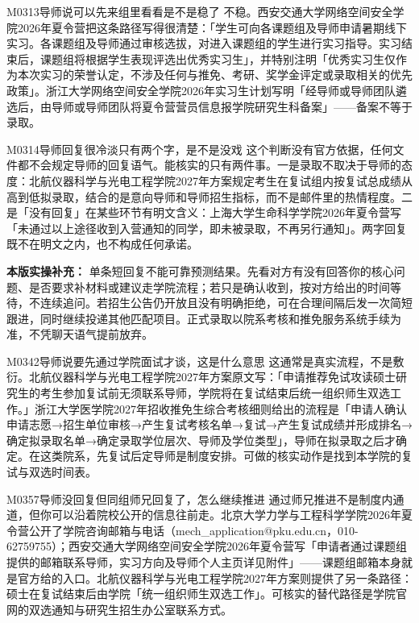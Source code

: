 \begin{qa}{M0313}{导师说可以先来组里看看是不是稳了}
不稳。西安交通大学网络空间安全学院2026年夏令营把这条路径写得很清楚：「学生可向各课题组及导师申请暑期线下实习。各课题组及导师通过审核选拔，对进入课题组的学生进行实习指导。实习结束后，课题组将根据学生表现评选出优秀实习生」，并特别注明「优秀实习生仅作为本次实习的荣誉认定，不涉及任何与推免、考研、奖学金评定或录取相关的优先政策」。浙江大学网络空间安全学院2026年实习生计划写明「经导师或导师团队遴选后，由导师或导师团队将夏令营营员信息报学院研究生科备案」——备案不等于录取。
\end{qa}

\begin{qa}{M0314}{导师回复很冷淡只有两个字，是不是没戏}
这个判断没有官方依据，任何文件都不会规定导师的回复语气。能核实的只有两件事。一是录取不取决于导师的态度：北航仪器科学与光电工程学院2027年方案规定考生在复试组内按复试总成绩从高到低拟录取，结合的是意向导师和导师招生指标，而不是邮件里的热情程度。二是「没有回复」在某些环节有明文含义：上海大学生命科学学院2026年夏令营写「未通过以上途径收到入营通知的同学，即未被录取，不再另行通知」。两字回复既不在明文之内，也不构成任何承诺。
\par\textbf{本版实操补充：} 单条短回复不能可靠预测结果。先看对方有没有回答你的核心问题、是否要求补材料或建议走学院流程；若只是确认收到，按对方给出的时间等待，不连续追问。若招生公告仍开放且没有明确拒绝，可在合理间隔后发一次简短跟进，同时继续投递其他匹配项目。正式录取以院系考核和推免服务系统手续为准，不凭聊天语气提前放弃。
\end{qa}

\begin{qa}{M0342}{导师说要先通过学院面试才谈，这是什么意思}
这通常是真实流程，不是敷衍。北航仪器科学与光电工程学院2027年方案原文写：「申请推荐免试攻读硕士研究生的考生参加复试前无须联系导师，学院将在复试结束后统一组织师生双选工作。」浙江大学医学院2027年招收推免生综合考核细则给出的流程是「申请人确认申请志愿→招生单位审核→产生复试考核名单→复试→产生复试成绩并形成排名→确定拟录取名单→确定录取学位层次、导师及学位类型」，导师在拟录取之后才确定。在这类院系，先复试后定导师是制度安排。可做的核实动作是找到本学院的复试与双选时间表。
\end{qa}

\begin{qa}{M0357}{导师没回复但同组师兄回复了，怎么继续推进}
通过师兄推进不是制度内通道，但你可以沿着院校公开的信息往前走。北京大学力学与工程科学学院2026年夏令营公开了学院咨询邮箱与电话（mech\_application@pku.edu.cn，010-62759755）；西安交通大学网络空间安全学院2026年夏令营写「申请者通过课题组提供的邮箱联系导师，实习方向及导师个人主页详见附件」——课题组邮箱本身就是官方给的入口。北航仪器科学与光电工程学院2027年方案则提供了另一条路径：硕士在复试结束后由学院「统一组织师生双选工作」。可核实的替代路径是学院官网的双选通知与研究生招生办公室联系方式。
\end{qa}

